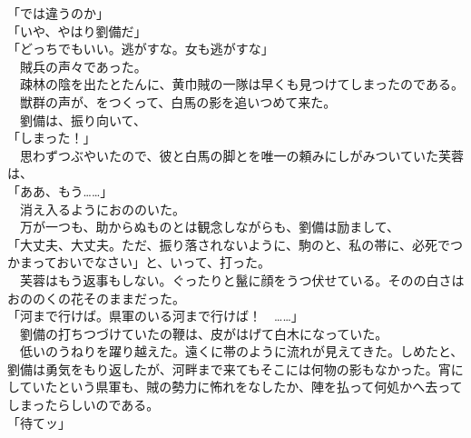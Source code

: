 \documentclass[
  paper=a5,
  fontsize=10pt,
  jafontsize=9.5pt,
  tate,                  %
  open_bracket_pos=nibu, %
]{jlreq}
\begin{document}
「では違うのか」\\


「いや、やはり劉備だ」\\


「どっちでもいい。逃がすな。女も逃がすな」\\


　賊兵の声々であった。\\


　疎林の陰を出たとたんに、黄巾賊の一隊は早くも見つけてしまったのである。\\


　獣群の声が、をつくって、白馬の影を追いつめて来た。\\


　劉備は、振り向いて、\\


「しまった！」\\


　思わずつぶやいたので、彼と白馬の脚とを唯一の頼みにしがみついていた芙蓉は、\\


「ああ、もう……」\\


　消え入るようにおののいた。\\


　万が一つも、助からぬものとは観念しながらも、劉備は励まして、\\


「大丈夫、大丈夫。ただ、振り落されないように、駒のと、私の帯に、必死でつかまっておいでなさい」と、いって、打った。\\


　芙蓉はもう返事もしない。ぐったりと鬣に顔をうつ伏せている。そのの白さはおののくの花そのままだった。\\


「河まで行けば。県軍のいる河まで行けば！　……」\\


　劉備の打ちつづけていたの鞭は、皮がはげて白木になっていた。\\


　低いのうねりを躍り越えた。遠くに帯のように流れが見えてきた。しめたと、劉備は勇気をもり返したが、河畔まで来てもそこには何物の影もなかった。宵にしていたという県軍も、賊の勢力に怖れをなしたか、陣を払って何処かへ去ってしまったらしいのである。\\


「待てッ」\\
\end{document}
